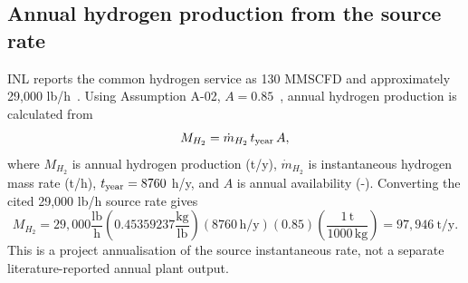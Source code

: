 \subsection{Annual hydrogen production from the source rate}
INL reports the common hydrogen service as 130 MMSCFD and approximately 29,000 lb/h~\cite{inltev953,inltev961}. Using Assumption A-02, $A=0.85$~\cite{nishihara2007potential}, annual hydrogen production is calculated from
\begin{equation}\label{eq:annual-h2-general}
M_{H_2}=\dot m_{H_2}\,t_{\rm year}\,A,
\end{equation}
where $M_{H_2}$ is annual hydrogen production (t/y), $\dot m_{H_2}$ is instantaneous hydrogen mass rate (t/h), $t_{\rm year}=8760$ h/y, and $A$ is annual availability (-). Converting the cited 29,000 lb/h source rate gives
\begin{equation}\label{eq:annual-h2}
M_{H_2}=29{,}000\frac{\mathrm{lb}}{\mathrm h}
\left(0.45359237\frac{\mathrm{kg}}{\mathrm{lb}}\right)
(8760\,\mathrm{h/y})(0.85)
\left(\frac{1\,\mathrm t}{1000\,\mathrm{kg}}\right)
=97{,}946~\mathrm{t/y}.
\end{equation}
This is a project annualisation of the source instantaneous rate, not a separate literature-reported annual plant output.

